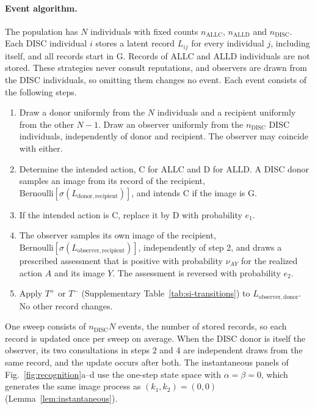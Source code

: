 \documentclass[fleqn,10pt]{wlscirep}
\newcommand{\ALLC}{\mathrm{ALLC}}
\newcommand{\ALLD}{\mathrm{ALLD}}
\newcommand{\DISC}{\mathrm{DISC}}
\theoremstyle{plain}
\begin{document}
\paragraph{Event algorithm.} The population has $N$ individuals with fixed counts $n_{\ALLC}$, $n_{\ALLD}$ and $n_{\DISC}$. Each DISC individual $i$ stores a latent record $L_{ij}$ for every individual $j$, including itself, and all records start in G. Records of ALLC and ALLD individuals are not stored. These strategies never consult reputations, and observers are drawn from the DISC individuals, so omitting them changes no event. Each event consists of the following steps.
\begin{enumerate}
\item Draw a donor uniformly from the $N$ individuals and a recipient uniformly from the other $N-1$. Draw an observer uniformly from the $n_{\DISC}$ DISC individuals, independently of donor and recipient. The observer may coincide with either.
\item Determine the intended action, C for ALLC and D for ALLD. A DISC donor samples an image from its record of the recipient, $\mathrm{Bernoulli}[\sigma(L_{\mathrm{donor,recipient}})]$, and intends C if the image is G.
\item If the intended action is C, replace it by D with probability $e_1$.
\item The observer samples its own image of the recipient, $\mathrm{Bernoulli}[\sigma(L_{\mathrm{observer,recipient}})]$, independently of step 2, and draws a prescribed assessment that is positive with probability $\nu_{AY}$ for the realized action $A$ and its image $Y$. The assessment is reversed with probability $e_2$.
\item Apply $T^+$ or $T^-$ (Supplementary Table~\ref{tab:si-transitions}) to $L_{\mathrm{observer,donor}}$. No other record changes.
\end{enumerate}
One sweep consists of $n_{\DISC}N$ events, the number of stored records, so each record is updated once per sweep on average. When the DISC donor is itself the observer, its two consultations in steps 2 and 4 are independent draws from the same record, and the update occurs after both. The instantaneous panels of Fig.~\ref{fig:recognition}a--d use the one-step state space with $\alpha=\beta=0$, which generates the same image process as $(k_1,k_2)=(0,0)$ (Lemma~\ref{lem:instantaneous}).
\end{document}
